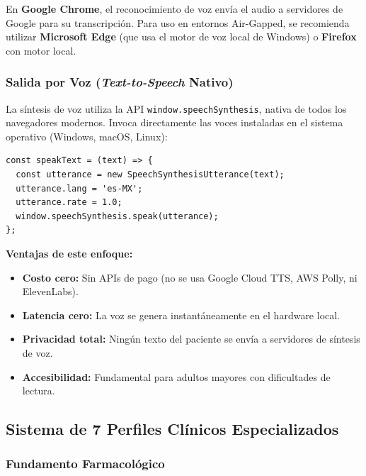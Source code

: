 \documentclass[12pt,a4paper]{article}
\begin{document}
\begin{warningbox}
  En \textbf{Google Chrome}, el reconocimiento de voz envía el audio a servidores de Google para
  su transcripción. Para uso en entornos Air-Gapped, se recomienda utilizar \textbf{Microsoft Edge}
  (que usa el motor de voz local de Windows) o \textbf{Firefox} con motor local.
\end{warningbox}

\subsubsection{Salida por Voz (\textit{Text-to-Speech} Nativo)}

La síntesis de voz utiliza la API \texttt{window.speechSynthesis}, nativa de todos los navegadores
modernos. Invoca directamente las voces instaladas en el sistema operativo (Windows, macOS, Linux):

\begin{lstlisting}[style=javascript, caption=Síntesis de voz nativa del sistema operativo]
const speakText = (text) => {
  const utterance = new SpeechSynthesisUtterance(text);
  utterance.lang = 'es-MX';
  utterance.rate = 1.0;
  window.speechSynthesis.speak(utterance);
};
\end{lstlisting}

\textbf{Ventajas de este enfoque:}
\begin{itemize}
  \item \textbf{Costo cero:} Sin APIs de pago (no se usa Google Cloud TTS, AWS Polly, ni ElevenLabs).
  \item \textbf{Latencia cero:} La voz se genera instantáneamente en el hardware local.
  \item \textbf{Privacidad total:} Ningún texto del paciente se envía a servidores de síntesis de voz.
  \item \textbf{Accesibilidad:} Fundamental para adultos mayores con dificultades de lectura.
\end{itemize}

\newpage

\subsection{Sistema de 7 Perfiles Clínicos Especializados}

\subsubsection{Fundamento Farmacológico}
\end{document}
